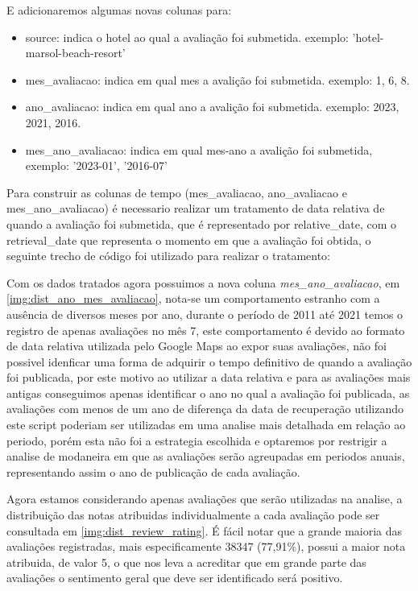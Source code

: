 E adicionaremos algumas novas colunas para:

\begin{itemize}
	\item source: indica o hotel ao qual a avaliação foi submetida. exemplo: 'hotel-marsol-beach-resort'
	\item mes\_avaliacao: indica em qual mes a avalição foi submetida. exemplo: 1, 6, 8.
	\item ano\_avaliacao: indica em qual ano a avalição foi submetida. exemplo: 2023, 2021, 2016.
	\item mes\_ano\_avaliacao: indica em qual mes-ano a avalição foi submetida, exemplo: '2023-01', '2016-07'
\end{itemize}


Para construir as colunas de tempo (mes\_avaliacao, ano\_avaliacao e mes\_ano\_avaliacao) é necessario realizar um tratamento de data relativa de quando a avaliação foi submetida, que é representado por relative\_date, com o retrieval\_date que representa o momento em que a avaliação foi obtida, o seguinte trecho de código foi utilizado para realizar o tratamento:


Com os dados tratados agora possuimos a nova coluna \emph{mes\_ano\_avaliacao}, em \ref{img:dist_ano_mes_avaliacao}, nota-se um comportamento estranho com a ausência de diversos meses por ano, durante o período de 2011 até 2021 temos o registro de apenas avaliações no mês 7, este comportamento é devido ao formato de data relativa utilizada pelo Google Maps ao expor suas avaliações, não foi possivel idenficar uma forma de adquirir o tempo definitivo de quando a avaliação foi publicada, por este motivo ao utilizar a data relativa e para as avaliações mais antigas conseguimos apenas identificar o ano no qual a avaliação foi publicada, as avaliações com menos de um ano de diferença da data de recuperação utilizando este script poderiam ser utilizadas em uma analise mais detalhada em relação ao periodo, porém esta não foi a estrategia escolhida e optaremos por restrigir a analise de modaneira em que as avaliações serão agreupadas em periodos anuais, representando assim o ano de publicação de cada avaliação.

Agora estamos considerando apenas avaliações que serão utilizadas na analise, a distribuição das notas atribuidas individualmente a cada avaliação pode ser consultada em \ref{img:dist_review_rating}. É fácil notar que a grande maioria das avaliações registradas, mais especificamente 38347 (77,91\%), possui a maior nota atribuida, de valor 5, o que nos leva a acreditar que em grande parte das avaliações o sentimento geral que deve ser identificado será positivo.

